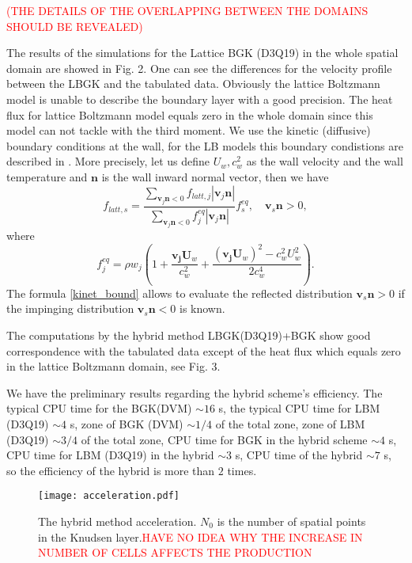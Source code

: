 \documentclass[]{elsarticle} %
\begin{document}
{\textcolor{red}{(THE DETAILS OF THE  OVERLAPPING  BETWEEN THE DOMAINS SHOULD BE REVEALED)  }

The results of the simulations for the Lattice BGK  (D3Q19) in the whole spatial domain are showed in Fig. 2. One can see the differences for the velocity profile between the LBGK and the tabulated data. Obviously the lattice Boltzmann  model is  unable to describe  the  boundary layer with a good precision.
The  heat flux for lattice Boltzmann model equals zero in the whole domain since this model can not tackle with the third  moment.   We use  the  kinetic (diffusive) boundary conditions at the wall, for the LB models  this boundary condistions are described in
\cite{ansumali2002}. More  precisely, let us define $U_w, c_w^2$  as the wall velocity and  the wall temperature and $\mathbf{n}$ is  the wall inward normal vector, then we  have
\begin{equation}\label{kinet_bound}
f_{latt, s}=
\frac{\sum_{\mathbf{v}_j\mathbf{n}<0} f_{latt,j}|\mathbf{v}_j\mathbf{n}|}{\sum_{\mathbf{v}_j\mathbf{n}<0}
f^{eq}_j|\mathbf{v}_j\mathbf{n}|}f^{eq}_s, \quad  \mathbf{v}_s \mathbf{n}>0,
\end{equation}
where
$$
f^{eq}_{j}=\rho w_j\left(1+ \frac{\mathbf{v_j}\mathbf{U}_w}{c_w^2}+\frac{(\mathbf{v_j}\mathbf{U}_w)^2-c_w^2U_w^2}{2c_w^4}\right).
$$
 The formula  \eqref{kinet_bound}  allows to evaluate  the reflected distribution $\mathbf{v}_s\mathbf{n}>0$ if the  impinging distribution $\mathbf{v}_s\mathbf{n}<0$ is  known.

 The computations by the hybrid method LBGK(D3Q19)+BGK show good correspondence with the tabulated data except of the heat flux which equals zero in the lattice Boltzmann domain, see Fig. 3.

We have the preliminary results regarding the hybrid scheme’s efficiency. The typical CPU time for the BGK(DVM) $\sim 16$ s, the typical CPU time for LBM (D3Q19) $\sim 4$ s, zone of BGK (DVM) $\sim 1/4$ of the total zone, zone of LBM (D3Q19) $\sim 3/4 $ of the total zone, CPU time for BGK in the hybrid scheme $\sim 4$ s, CPU time for LBM (D3Q19) in the hybrid $\sim 3$ s, CPU time of the hybrid $\sim 7$ s, so the efficiency of the hybrid is more than $2$ times.

\begin{figure}[!h]
\centering
\texttt{[image: acceleration.pdf]}
\caption{The hybrid method acceleration. $N_0$ is the number of spatial points in the Knudsen layer.\textcolor{red}{HAVE  NO IDEA  WHY THE INCREASE IN NUMBER  OF CELLS AFFECTS THE PRODUCTION}}
\end{figure}

}
\end{document}
